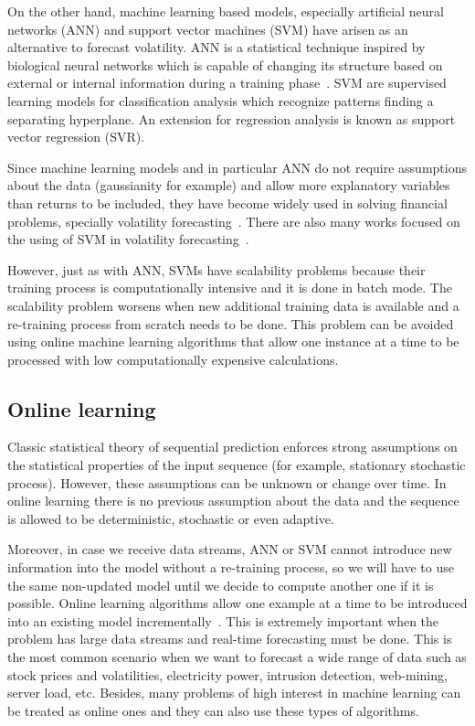 On the other hand, machine learning based models, especially artificial neural networks (ANN) and support vector machines (SVM) have arisen as an alternative to forecast volatility. ANN is a statistical technique inspired by biological neural networks which is capable of changing its structure based on external or internal information during a training phase~\cite{sammut2011}. SVM are supervised learning models for classification analysis which recognize patterns finding a separating hyperplane. An extension for regression analysis is known as support vector regression (SVR). 

Since machine learning models and in particular ANN do not require assumptions about the data (gaussianity for example) and allow more explanatory variables than returns to be included, they have become widely used in solving financial problems, specially volatility forecasting~\cite{hamidetal2004,donaldsonetal1997}. There are also many works focused on the using of SVM in volatility forecasting~\cite{shiyietal2008,shiyietal2010,gavrishchaka2006,vasilios2012}. 

However, just as with ANN, SVMs have scalability problems because their training process is computationally intensive and it is done in batch mode. The scalability problem worsens when new additional training data is available and a re-training process from scratch needs to be done. This problem can be avoided using online machine learning algorithms that allow one instance at a time to be processed with low computationally expensive calculations.


\subsection{Online learning}

Classic statistical theory of sequential prediction enforces strong assumptions on the statistical properties of the input sequence (for example, stationary stochastic process). However, these assumptions can be unknown or change over time. In online learning there is no previous assumption about the data and the sequence is allowed to be deterministic, stochastic or even adaptive.  

Moreover, in case we receive data streams, ANN or SVM cannot introduce new information into the model without a re-training process, so we will have to use the same non-updated model until we decide to compute another one if it is possible.  Online learning algorithms allow one example at a time to be introduced into an existing model incrementally~\cite{vovk2005}. This is extremely important when the problem has large data streams and real-time forecasting must be done.  This is the most common scenario when we want to forecast a wide range of data such as stock prices and volatilities, electricity power, intrusion detection, web-mining, server load, etc.  Besides, many problems of high interest in machine learning can be treated as online ones and they can also use these types of algorithms.

